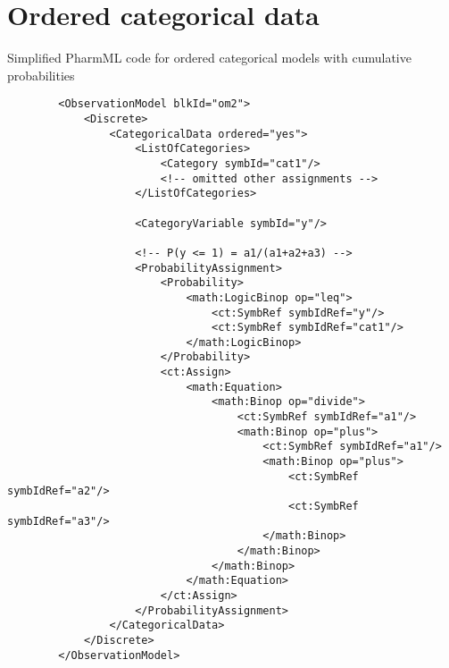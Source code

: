 \section{Ordered categorical data}
Simplified PharmML code for ordered categorical models with cumulative probabilities
\lstset{language=XML}
\begin{lstlisting}
        <ObservationModel blkId="om2">
            <Discrete>
                <CategoricalData ordered="yes">
                    <ListOfCategories> 
                        <Category symbId="cat1"/>
                        <!-- omitted other assignments -->
                    </ListOfCategories>
                    
                    <CategoryVariable symbId="y"/>
                    
                    <!-- P(y <= 1) = a1/(a1+a2+a3) --> 
                    <ProbabilityAssignment>
                        <Probability>
                            <math:LogicBinop op="leq">
                                <ct:SymbRef symbIdRef="y"/>
                                <ct:SymbRef symbIdRef="cat1"/>
                            </math:LogicBinop>
                        </Probability>
                        <ct:Assign>
                            <math:Equation>
                                <math:Binop op="divide">
                                    <ct:SymbRef symbIdRef="a1"/>
                                    <math:Binop op="plus">
                                        <ct:SymbRef symbIdRef="a1"/>
                                        <math:Binop op="plus">
                                            <ct:SymbRef symbIdRef="a2"/>
                                            <ct:SymbRef symbIdRef="a3"/>
                                        </math:Binop>
                                    </math:Binop>
                                </math:Binop>
                            </math:Equation>
                        </ct:Assign>
                    </ProbabilityAssignment>
                </CategoricalData>
            </Discrete>
        </ObservationModel>
\end{lstlisting}

